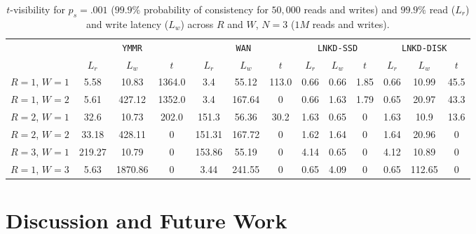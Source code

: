 \documentclass{vldb}
\newcommand{\sectionskip}{-0em}
\begin{document}
\begin{table}
\centering
\begin{tabular}{c|c|c|c|c|c|c|c|c|c|c|c|c|}
\cline{2-13}
& \multicolumn{3}{|c|}{\texttt{YMMR}} & \multicolumn{3}{|c|}{\texttt{WAN}} & \multicolumn{3}{|c|}{\texttt{LNKD-SSD}} & \multicolumn{3}{|c|}{\texttt{LNKD-DISK}}\\
&\multicolumn{1}{|c}{$L_r$}  & \multicolumn{1}{c}{$L_w$} & \multicolumn{1}{c|}{$t$} &  \multicolumn{1}{|c}{$L_r$} & \multicolumn{1}{c}{$L_w$} & \multicolumn{1}{c|}{$t$} &  \multicolumn{1}{|c}{$L_r$} & \multicolumn{1}{c}{$L_w$} & \multicolumn{1}{c|}{$t$} &  \multicolumn{1}{|c}{$L_r$} & \multicolumn{1}{c}{$L_w$} & \multicolumn{1}{c|}{$t$} \\\hline
\multicolumn{1}{|c|}{$R$$=$$1$, $W$$=$$1$}
& 5.58 & 10.83 & 1364.0 & 3.4 & 55.12 & 113.0 & 0.66 & 0.66 & 1.85 & 0.66 & 10.99 & 45.5 \\
\multicolumn{1}{|c|}{$R$$=$$1$, $W$$=$$2$}
& 5.61 & 427.12 & 1352.0 & 3.4 & 167.64 & 0 & 0.66 & 1.63 & 1.79 & 0.65 & 20.97 & 43.3 \\
\multicolumn{1}{|c|}{$R$$=$$2$, $W$$=$$1$}
& 32.6 & 10.73 & 202.0 & 151.3 & 56.36 & 30.2 & 1.63 & 0.65 & 0 & 1.63 & 10.9 & 13.6 \\
\multicolumn{1}{|c|}{$R$$=$$2$, $W$$=$$2$}
& 33.18 & 428.11 & 0 & 151.31 & 167.72 & 0 & 1.62 & 1.64 & 0 & 1.64 & 20.96 & 0 \\
\multicolumn{1}{|c|}{$R$$=$$3$, $W$$=$$1$}
& 219.27 & 10.79 & 0 & 153.86 & 55.19 & 0 & 4.14 & 0.65 & 0 & 4.12 & 10.89 & 0 \\
\multicolumn{1}{|c|}{$R$$=$$1$, $W$$=$$3$}
& 5.63 & 1870.86 & 0 & 3.44 & 241.55 & 0 & 0.65 & 4.09 & 0 & 0.65 & 112.65 & 0 \\
\hline
\end{tabular}
\vspace{-4pt}
\caption{$t$-visibility for $p_{s} = .001$ ($99.9\%$ probability
  of consistency for $50,000$ reads and writes) and $99.9\%$ read
  ($L_r$) and write latency ($L_w$) across $R$ and $W$, $N$$=$$3$
  ($1M$ reads and writes).}
\vspace{-12pt}
\label{table:lat-stale}
\end{table}


\vspace{\sectionskip}\section{Discussion and Future Work}
\label{sec:discussion}
\end{document}
